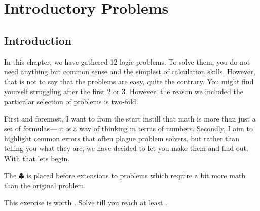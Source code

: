 \chapter{Introductory Problems}

\section{Introduction}

In this chapter, we have gathered 12 logic problems. To solve them, 
you do not need anything but common sense and the simplest of calculation skills. 
However, that is not to say that the problems are easy, quite the contrary. 
You might find yourself struggling after the first 2 or 3. 
However, the reason we included the particular selection of problems is two-fold. 

First and foremost, I want to from the start instill that math is more than just a set of formulas---
it is a way of thinking in terms of numbers. 
Secondly, I aim to highlight common errors that often plague problem solvers, 
but rather than telling you what they are, 
we have decided to let you make them and find out. With that lets begin.\par\medskip

The \(\clubsuit\) is placed before extensions to problems which require
a bit more math than the original problem.

This exercise is worth . Solve till you reach at least .  

